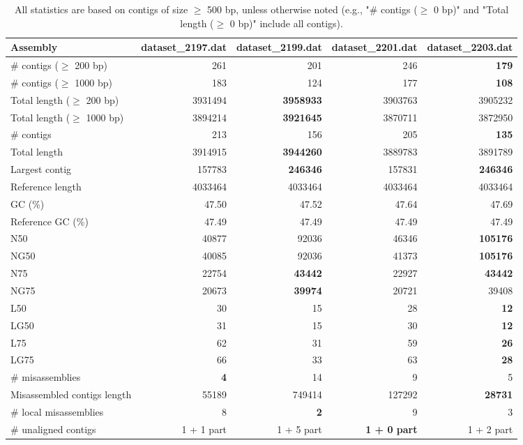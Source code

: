 \documentclass[12pt,a4paper]{article}
\begin{document}
\begin{table}[ht]
\begin{center}
\caption{All statistics are based on contigs of size $\geq$ 500 bp, unless otherwise noted (e.g., "\# contigs ($\geq$ 0 bp)" and "Total length ($\geq$ 0 bp)" include all contigs).}
\begin{tabular}{|l*{4}{|r}|}
\hline
Assembly & dataset\_2197.dat & dataset\_2199.dat & dataset\_2201.dat & dataset\_2203.dat \\ \hline
\# contigs ($\geq$ 200 bp) & 261 & 201 & 246 & {\bf 179} \\ \hline
\# contigs ($\geq$ 1000 bp) & 183 & 124 & 177 & {\bf 108} \\ \hline
Total length ($\geq$ 200 bp) & 3931494 & {\bf 3958933} & 3903763 & 3905232 \\ \hline
Total length ($\geq$ 1000 bp) & 3894214 & {\bf 3921645} & 3870711 & 3872950 \\ \hline
\# contigs & 213 & 156 & 205 & {\bf 135} \\ \hline
Total length & 3914915 & {\bf 3944260} & 3889783 & 3891789 \\ \hline
Largest contig & 157783 & {\bf 246346} & 157831 & {\bf 246346} \\ \hline
Reference length & 4033464 & 4033464 & 4033464 & 4033464 \\ \hline
GC (\%) & 47.50 & 47.52 & 47.64 & 47.69 \\ \hline
Reference GC (\%) & 47.49 & 47.49 & 47.49 & 47.49 \\ \hline
N50 & 40877 & 92036 & 46346 & {\bf 105176} \\ \hline
NG50 & 40085 & 92036 & 41373 & {\bf 105176} \\ \hline
N75 & 22754 & {\bf 43442} & 22927 & {\bf 43442} \\ \hline
NG75 & 20673 & {\bf 39974} & 20721 & 39408 \\ \hline
L50 & 30 & 15 & 28 & {\bf 12} \\ \hline
LG50 & 31 & 15 & 30 & {\bf 12} \\ \hline
L75 & 62 & 31 & 59 & {\bf 26} \\ \hline
LG75 & 66 & 33 & 63 & {\bf 28} \\ \hline
\# misassemblies & {\bf 4} & 14 & 9 & 5 \\ \hline
Misassembled contigs length & 55189 & 749414 & 127292 & {\bf 28731} \\ \hline
\# local misassemblies & 8 & {\bf 2} & 9 & 3 \\ \hline
\# unaligned contigs & 1 + 1 part & 1 + 5 part & {\bf 1 + 0 part} & 1 + 2 part \\ \hline

\end{tabular}
\end{center}
\end{table}
\end{document}
